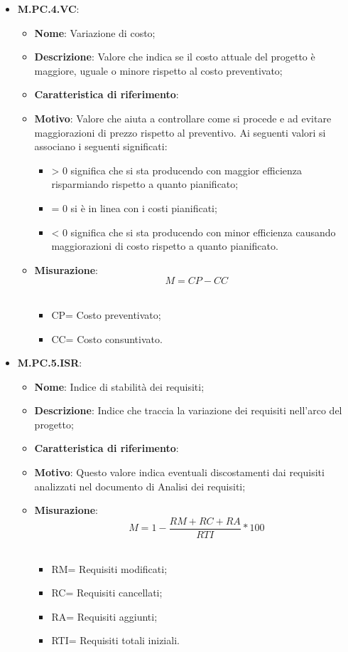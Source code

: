 \documentclass[10pt, a4paper]{article}
\begin{document}
\begin{itemize}
    \item \textbf{M.PC.4.VC}:
    \begin{itemize}
        \item \textbf{Nome}: Variazione di costo;
        \item \textbf{Descrizione}: Valore che indica se il costo attuale del progetto è maggiore, uguale o minore rispetto al costo preventivato;
        \item \textbf{Caratteristica di riferimento}:
        \item \textbf{Motivo}: Valore che aiuta a controllare come si procede e ad evitare maggiorazioni di prezzo rispetto al preventivo. Ai seguenti valori si associano i seguenti significati:
        \begin{itemize}
            \item > 0 significa che si sta producendo con maggior efficienza risparmiando rispetto a quanto pianificato;
            \item = 0 si è in linea con i costi pianificati;
            \item < 0 significa che si sta producendo con minor efficienza causando maggiorazioni di costo rispetto a quanto pianificato.
        \end{itemize}
        \item \textbf{Misurazione}:  \[ M=CP-CC \] \\
        \begin{itemize}
        \item CP= Costo preventivato;
        \item CC= Costo consuntivato.\\
        \end{itemize}
    \end{itemize}

    \item \textbf{M.PC.5.ISR}:
    \begin{itemize}
        \item \textbf{Nome}: Indice di stabilità dei requisiti;
        \item \textbf{Descrizione}: Indice che traccia la variazione dei requisiti nell’arco del progetto;
        \item \textbf{Caratteristica di riferimento}:
        \item \textbf{Motivo}: Questo valore indica eventuali discostamenti dai requisiti analizzati nel documento di Analisi dei requisiti; 
        \item \textbf{Misurazione}: \[ M=1- \frac{RM + RC + RA}{RTI} *100 \] \\
        \begin{itemize}
        \item RM= Requisiti modificati;
        \item RC= Requisiti cancellati;
        \item RA= Requisiti aggiunti;
        \item RTI= Requisiti totali iniziali.\\
        \end{itemize}
    \end{itemize}


\end{itemize}
\end{document}
